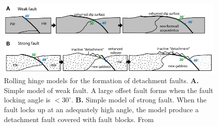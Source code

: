 \documentclass[letterpaper,12pt,notitle]{memphisthesis}                     %
\begin{document}
\begin{figure}[!htb]
	\centering
	\includegraphics[width=0.9\linewidth]{./figs/rollinghinge.png}
	\caption{Rolling hinge models for the formation of detachment faults. \textbf{A.} Simple model of weak fault. A large offset fault forms when the fault locking angle is $< 30 ^{\circ}$. \textbf{B.} Simple model of strong fault. When the fault locks up at an adequately high angle, the model produce a detachment fault covered with fault blocks. From \citet{Reston2011}}
	\label{fig:rollinghinge}
\end{figure}
\end{document}
